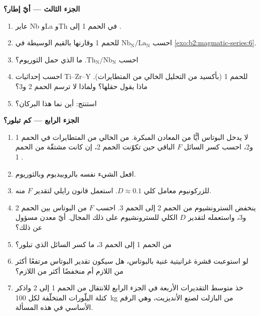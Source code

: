 \begin{problem}
\noindent\textbf{الجزء الثالث --- أيّ إطار؟}
\begin{enumerate}[resume]
\item عاير Nb وLa وTh في الحمم 1 إلى .
\item احسب $\mathrm{Nb_N}/\mathrm{La_N}$ للحمم 1 وقارنها بالقيم الوسيطة
في \cref{exo:b2:magmatic-series:6}.
\item احسب $\mathrm{Th_N}/\mathrm{Nb_N}$. ما الذي حمل الثوريوم؟
\item احسب إحداثيات Ti--Zr--Y للحمم 1 (بأكسيد  من التحليل الخالي من
المتطايرات). ماذا يقول حقلها؟ ولماذا لا ترسم الحمم 2 و3؟
\item استنتج: أين نما هذا البركان؟
\end{enumerate}

\noindent\textbf{الجزء الرابع --- كم تبلور؟}
\begin{enumerate}[resume]
\item لا يدخل البوتاس أيًّا من المعادن المبكرة. من  الخالي من المتطايرات في
الحمم 1 و2، احسب كسر السائل $F$ الباقي حين تكوّنت الحمم 2، إن كانت
مشتقّة من الحمم 1 .
\item افعل الشيء نفسه بالروبيديوم وبالثوريوم.
\item للزركونيوم معامل كلي $D \approx 0.1$. استعمل قانون رايلي لتقدير $F$ منه.
\item ينخفض السترونشيوم من الحمم 2 إلى الحمم 3. احسب $F$ من البوتاس بين الحمم 2
و3، واستعمله لتقدير $D$ الكلي للسترونشيوم على ذلك المجال. أيّ معدن
مسؤول عن ذلك؟
\item من الحمم 1 إلى الحمم 3، ما كسر السائل الذي تبلور؟
\item لو استوعبت  قشرة غرانيتية غنية بالبوتاس، هل سيكون تقدير
البوتاس مرتفعًا أكثر من اللازم أم منخفضًا أكثر من اللازم؟
\item خذ متوسط التقديرات الأربعة في الجزء الرابع للانتقال من الحمم 1 إلى 2 واذكر كتلة
البلّورات المتخلّفة لكل \qty{100}{kg} من البازلت لصنع الأنديزيت، وهي الرقم الأساسي
في هذه المسألة.
\end{enumerate}
\end{problem}
